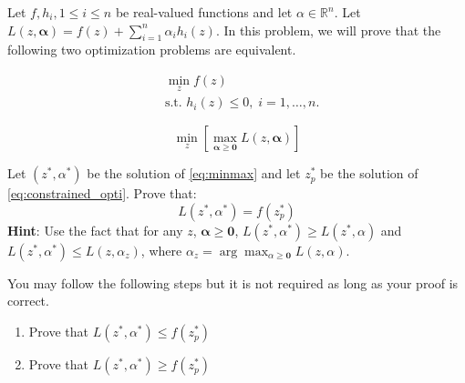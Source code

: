 \documentclass[11pt]{article}
\newenvironment{problem}[2][Problem]{\begin{trivlist}
\item[\hskip \labelsep {\bfseries #1}\hskip \labelsep {\bfseries #2.}]}{\end{trivlist}}
\begin{document}
\begin{problem}{1. (15 points)}
\begin{center}
\end{center}

\end{problem}

\begin{problem}{2. (10 points)}
Let $f, h_i, 1\leq i\leq n$ be real-valued functions and let $\alpha \in \mathbb{R}^n$. Let $L(z,\bm{\alpha}) = f(z) + \sum\limits_{i=1}^{n} \alpha_i h_i(z)$. In this problem, we will prove that the following two optimization problems are equivalent.

\begin{minipage}{0.45\textwidth}
\begin{equation}\label{eq:constrained_opti}
\begin{aligned}
& \min_z f(z) \\
& \text{s.t. } h_i(z) \leq 0, \; i = 1, \ldots, n.
\end{aligned}
\end{equation} 
\end{minipage}%
\hfill
\begin{minipage}{0.45\textwidth}
\begin{equation}\label{eq:minmax}
\min_z \left[\max_{\bm{\alpha} \geq \bm{0}} L(z,\bm{\alpha})\right]
\end{equation}
\end{minipage}

Let $(z^*,\alpha^*)$ be the solution of \eqref{eq:minmax} and let $z_p^*$ be the solution of \eqref{eq:constrained_opti}.  Prove that:
	$$L(z^*, \alpha^*)  = f(z_p^*)$$
\textbf{Hint}: Use the fact that for any $z$, $\bm{\alpha} \geq \bm{0}$,  $L(z^*,\alpha^*) \geq L(z^*,\alpha)$ and $L(z^*, \alpha^*) \leq L(z,\alpha_z)$, where $\alpha_z = \arg \max_{\alpha \geq \bm{0}} L(z,\alpha)$.

You may follow the following steps but it is not required as long as your proof is correct.
\begin{enumerate}
\item Prove that $L(z^*, \alpha^*) \leq f(z_p^*)$
\item Prove that $L(z^*, \alpha^*) \geq f(z_p^*)$
\end{enumerate}
\end{problem}
\end{document}
